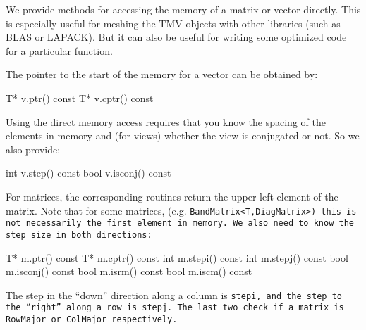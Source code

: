 We provide methods for accessing the memory of a matrix or vector directly.
This is especially useful for meshing the TMV objects with other libraries
(such as BLAS or LAPACK).  But it can also be useful for writing some
optimized code for a particular function.  

The pointer to the start of the memory for a vector can be obtained by:
\begin{tmvcode}
T* v.ptr()
const T* v.cptr() const
\end{tmvcode}

Using the direct memory access
requires that you know the spacing of the elements in memory and
(for views) whether the view is conjugated or not.  So we also provide:
\begin{tmvcode}
int v.step() const
bool v.isconj() const
\end{tmvcode}

For matrices, the corresponding routines return the upper-left element
of the matrix.  Note that for some matrices, (e.g. \tt{BandMatrix<T,DiagMatrix>}) 
this is not necessarily the first element in memory.  We also need to know the 
step size in both directions:
\begin{tmvcode}
T* m.ptr()
const T* m.cptr() const
int m.stepi() const
int m.stepj() const
bool m.isconj() const
bool m.isrm() const
bool m.iscm() const
\end{tmvcode}
The step in the ``down'' direction along a column is \tt{stepi}, and the step to 
the ``right'' along a row is \tt{stepj}.
The last two check if a matrix is \tt{RowMajor} or \tt{ColMajor} respectively.

